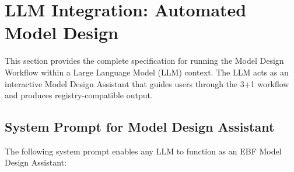 \section{LLM Integration: Automated Model Design}
\label{sec:eee-llm}

This section provides the complete specification for running the Model Design
Workflow within a Large Language Model (LLM) context. The LLM acts as an
interactive Model Design Assistant that guides users through the 3+1 workflow
and produces registry-compatible output.

\subsection{System Prompt for Model Design Assistant}

The following system prompt enables any LLM to function as an EBF Model Design
Assistant:

